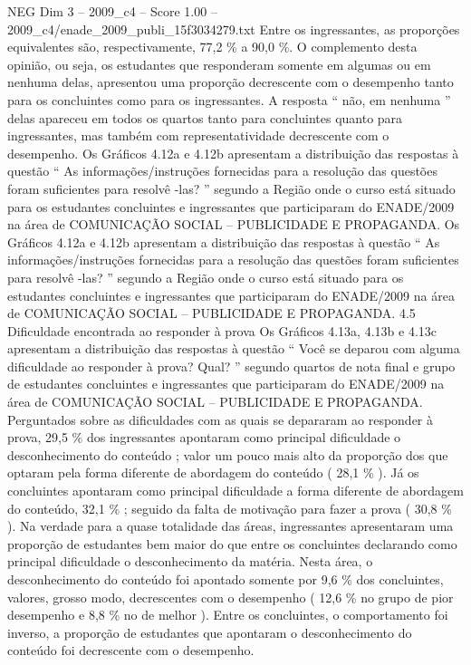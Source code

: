 \begin{textsample}{NEG Dim 3 – 2009\_c4 – Score 1.00 – 2009\_c4/enade\_2009\_publi\_15f3034279.txt}
Entre os ingressantes, as proporções equivalentes são, respectivamente, 77,2 \% a 90,0 \%.
O complemento desta opinião, ou seja, os estudantes que responderam somente em algumas ou em nenhuma delas, apresentou uma proporção decrescente com o desempenho tanto para os concluintes como para os ingressantes.
A resposta “ não, em nenhuma ” delas apareceu em todos os quartos tanto para concluintes quanto para ingressantes, mas também com representatividade decrescente com o desempenho.
Os Gráficos 4.12a e 4.12b apresentam a distribuição das respostas à questão “ As informações/instruções fornecidas para a resolução das questões foram suficientes para resolvê -las? ” segundo a Região onde o curso está situado para os estudantes concluintes e ingressantes que participaram do ENADE/2009 na área de COMUNICAÇÃO SOCIAL – PUBLICIDADE E PROPAGANDA.
Os Gráficos 4.12a e 4.12b apresentam a distribuição das respostas à questão “ As informações/instruções fornecidas para a resolução das questões foram suficientes para resolvê -las? ” segundo a Região onde o curso está situado para os estudantes concluintes e ingressantes que participaram do ENADE/2009 na área de COMUNICAÇÃO SOCIAL – PUBLICIDADE E PROPAGANDA. 4.5 Dificuldade encontrada ao responder à prova Os Gráficos 4.13a, 4.13b e 4.13c apresentam a distribuição das respostas à questão “ Você se deparou com alguma dificuldade ao responder à prova?
Qual? ” segundo quartos de nota final e grupo de estudantes concluintes e ingressantes que participaram do ENADE/2009 na área de COMUNICAÇÃO SOCIAL – PUBLICIDADE E PROPAGANDA.
Perguntados sobre as dificuldades com as quais se depararam ao responder à prova, 29,5 \% dos ingressantes apontaram como principal dificuldade o desconhecimento do conteúdo ; valor um pouco mais alto da proporção dos que optaram pela forma diferente de abordagem do conteúdo ( 28,1 \% ).
Já os concluintes apontaram como principal dificuldade a forma diferente de abordagem do conteúdo, 32,1 \% ; seguido da falta de motivação para fazer a prova ( 30,8 \% ).
Na verdade para a quase totalidade das áreas, ingressantes apresentaram uma proporção de estudantes bem maior do que entre os concluintes declarando como principal dificuldade o desconhecimento da matéria.
Nesta área, o desconhecimento do conteúdo foi apontado somente por 9,6 \% dos concluintes, valores, grosso modo, decrescentes com o desempenho ( 12,6 \% no grupo de pior desempenho e 8,8 \% no de melhor ).
Entre os concluintes, o comportamento foi inverso, a proporção de estudantes que apontaram o desconhecimento do conteúdo foi decrescente com o desempenho.

\end{textsample}
